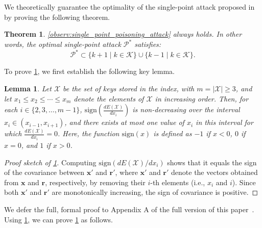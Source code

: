 \documentclass[acmsmall]{acmart}
\newtheorem{lemma}{Lemma}
\newtheorem{theorem}{Theorem}
\begin{document}
We theoretically guarantee the optimality of the single-point attack proposed in~\cite{kornaropoulos2022price} by proving the following theorem.
\begin{theorem_box}
    \begin{theorem}
    \label{thm:single_point_poisoning_attack}
    \cref{observ:single_point_poisoning_attack} always holds.
    In other words, the optimal single-point attack $\mathcal{P}^\ast$ satisfies:
    \begin{equation}
        \mathcal{P}^\ast \subset \{k + 1 \mid k \in \mathcal{K}\} \cup \{k - 1 \mid k \in \mathcal{K}\}.
    \end{equation}
    \end{theorem}
\end{theorem_box}
To prove \cref{thm:single_point_poisoning_attack}, we first establish the following key lemma.
\begin{theorem_box}
\begin{lemma}
\label{lem:single_point_poisoning_attack}
Let $\mathcal{X}$ be the set of keys stored in the index, with $m = |\mathcal{X}| \geq 3$, and let $x_1 \leq x_2 \leq \cdots \leq x_m$ denote the elements of $\mathcal{X}$ in increasing order.
Then, for each $i \in \{2, 3, \dots, m-1\}$, $\mathrm{sign}\left(\frac{d E(\mathcal{X})}{dx_i}\right)$ is non-decreasing over the interval $x_i \in (x_{i-1}, x_{i+1})$, and there exists at most one value of $x_i$ in this interval for which $\frac{d E(\mathcal{X})}{dx_i} = 0$.
Here, the function $\mathrm{sign}(x)$ is defined as $-1$ if $x < 0$, $0$ if $x = 0$, and $1$ if $x > 0$.
\end{lemma}
\end{theorem_box}
\begin{proof}[Proof sketch of \cref{lem:single_point_poisoning_attack}]
Computing $\mathrm{sign}\left(d E(\mathcal{X}) / dx_i \right)$ shows that it equals the sign of the covariance between $\bm{x}'$ and $\bm{r}'$, where $\bm{x}'$ and $\bm{r}'$ denote the vectors obtained from $\bm{x}$ and $\bm{r}$, respectively, by removing their $i$-th elements (i.e., $x_i$ and $i$).
Since both $\bm{x}'$ and $\bm{r}'$ are monotonically increasing, the sign of covariance is positive.
\end{proof}
We defer the full, formal proof to Appendix A of the full version of this paper~\cite{sato2026mathematical_arxiv}.
Using \cref{lem:single_point_poisoning_attack}, we can prove \cref{thm:single_point_poisoning_attack} as follows.
\end{document}
